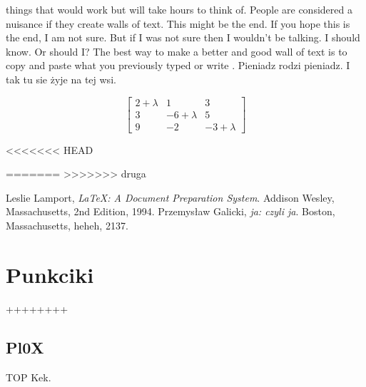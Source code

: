 \documentclass[11pt]{article}
\begin{document}
\begin{center}
things that would work but will take hours to think of. People are considered a nuisance if they create walls of text. This might be the end. If you hope this is the end, I am not sure. But if I was not sure then I wouldn't be talking. I should know. Or should I? The best way to make a better and good wall of text is to copy and paste what you previously typed or write
.\cite{Galicki96} Pieniadz rodzi pieniadz. I tak tu sie żyje na tej wsi.
\end{center}
\newpage
$$\left[\begin{array}{ccc}
2+\lambda&1&3\\
3&-6+\lambda&5\\
9&-2&-3+\lambda
\end{array}\right]$$




<<<<<<< HEAD

=======
%
>>>>>>> druga

\begin{thebibliography}{9}

  Leslie Lamport,
  \emph{\LaTeX: A Document Preparation System}.
  Addison Wesley, Massachusetts,
  2nd Edition,
  1994.
  Przemysław Galicki,
  \emph{ja: czyli ja}.
  Boston, Massachusetts,
  heheh,
  2137.

\end{thebibliography}

\section{Punkciki}

++++++++

\subsection{Pl0X}

TOP Kek.
\end{document}
